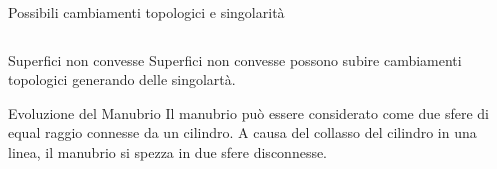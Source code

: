 \begin{frame}{Possibili cambiamenti topologici e singolarità}
  \begin{columns}[c]
    \begin{column}{5cm}
      \begin{block}{Superfici non convesse}
       Superfici non convesse possono subire cambiamenti topologici
       generando delle singolartà. 
       \end{block}
      \begin{exampleblock}{Evoluzione del Manubrio}
        Il manubrio può essere considerato come due sfere di equal
        raggio connesse da un cilindro. A causa del collasso del
        cilindro in una linea, il manubrio si spezza in due sfere
        disconnesse.
      \end{exampleblock}
    \end{column}
    \begin{column}[c]{5cm}
       \begin{center}
     \end{center}
    \end{column}
    \end{columns}
\end{frame}


